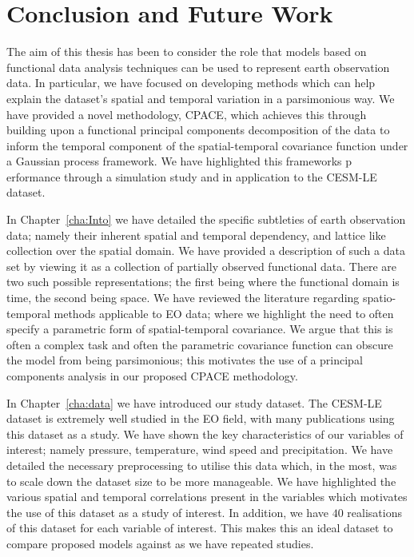 
\chapter{Conclusion and Future Work\label{cha:conclusions}}  %

\ifpdf
    \graphicspath{{Chapter9/Figs/Raster/}{Chapter9/Figs/PDF/}{Chapter9/Figs/}}
\else
    \graphicspath{{Chapter9/Figs/Vector/}{Chapter9/Figs/}}
\fi
The aim of this thesis has been to consider the role that models based on functional data analysis techniques can be used to represent earth observation data.
In particular, we have focused on developing methods which can help explain the dataset's spatial and temporal variation in a parsimonious way.
We have provided a novel methodology, CPACE, which achieves this through building upon a functional principal components decomposition of the data to inform the temporal component of the spatial-temporal covariance function under a Gaussian process framework.
We have highlighted this frameworks p erformance through a simulation study and in application to the CESM-LE dataset. 

In Chapter~\ref{cha:Into} we have detailed the specific subtleties of earth observation data; namely their inherent spatial and temporal dependency, and lattice like collection over the spatial domain.
We have provided a description of such a data set by viewing it as a collection of partially observed functional data.
There are two such possible representations; the first being where the functional domain is time, the second being space.
We have reviewed the literature regarding spatio-temporal methods applicable to EO data; where we highlight the need to often specify a parametric form of spatial-temporal covariance.
We argue that this is often a complex task and often the parametric covariance function can obscure the model from being parsimonious; this motivates the use of a principal components analysis in our proposed CPACE methodology.

In Chapter~\ref{cha:data} we have introduced our study dataset.
The CESM-LE dataset is extremely well studied in the EO field, with many publications using this dataset as a study.
We have shown the key characteristics of our variables of interest; namely pressure, temperature, wind speed and precipitation.
We have detailed the necessary preprocessing to utilise this data which, in the most, was to scale down the dataset size to be more manageable.
We have highlighted the various spatial and temporal correlations present in the variables which motivates the use of this dataset as a study of interest.
In addition, we have $40$ realisations of this dataset for each variable of interest.
This makes this an ideal dataset to compare proposed models against as we have repeated studies.

